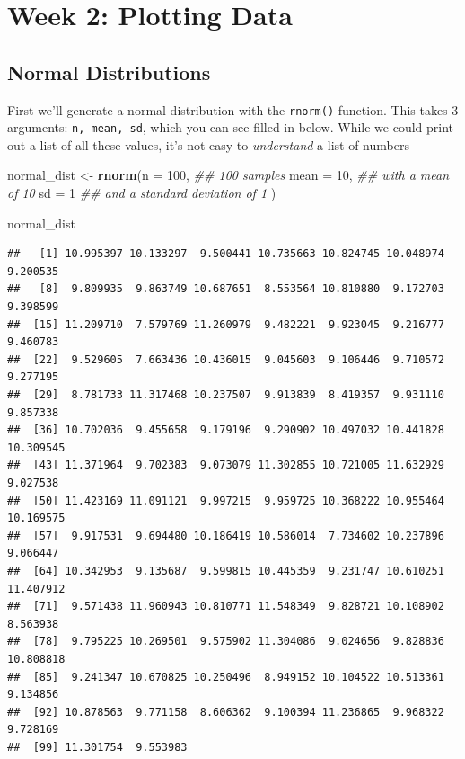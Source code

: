 \documentclass[
]{book}
\newenvironment{Shaded}{\begin{snugshade}}{\end{snugshade}}
\newcommand{\CommentTok}[1]{\textcolor[rgb]{0.56,0.35,0.01}{\textit{#1}}}
\newcommand{\DataTypeTok}[1]{\textcolor[rgb]{0.13,0.29,0.53}{#1}}
\newcommand{\DecValTok}[1]{\textcolor[rgb]{0.00,0.00,0.81}{#1}}
\newcommand{\KeywordTok}[1]{\textcolor[rgb]{0.13,0.29,0.53}{\textbf{#1}}}
\newcommand{\NormalTok}[1]{#1}
\newcommand{\StringTok}[1]{\textcolor[rgb]{0.31,0.60,0.02}{#1}}
\begin{document}
\hypertarget{week-2-plotting-data}{%
\section{Week 2: Plotting Data}\label{week-2-plotting-data}}

\hypertarget{normal-distributions}{%
\subsection{Normal Distributions}\label{normal-distributions}}

First we'll generate a normal distribution with the \texttt{rnorm()} function. This takes 3 arguments: \texttt{n,\ mean,\ sd}, which you can see filled in below. While we could print out a list of all these values, it's not easy to \emph{understand} a list of numbers

\begin{Shaded}
\begin{Highlighting}[]
\NormalTok{normal_dist <-}\StringTok{ }\KeywordTok{rnorm}\NormalTok{(}\DataTypeTok{n =} \DecValTok{100}\NormalTok{, }\CommentTok{## 100 samples}
                     \DataTypeTok{mean =} \DecValTok{10}\NormalTok{, }\CommentTok{## with a mean of 10}
                     \DataTypeTok{sd =} \DecValTok{1} \CommentTok{## and a standard deviation of 1}
\NormalTok{                     )}


\NormalTok{normal_dist}
\end{Highlighting}
\end{Shaded}

\begin{verbatim}
##   [1] 10.995397 10.133297  9.500441 10.735663 10.824745 10.048974  9.200535
##   [8]  9.809935  9.863749 10.687651  8.553564 10.810880  9.172703  9.398599
##  [15] 11.209710  7.579769 11.260979  9.482221  9.923045  9.216777  9.460783
##  [22]  9.529605  7.663436 10.436015  9.045603  9.106446  9.710572  9.277195
##  [29]  8.781733 11.317468 10.237507  9.913839  8.419357  9.931110  9.857338
##  [36] 10.702036  9.455658  9.179196  9.290902 10.497032 10.441828 10.309545
##  [43] 11.371964  9.702383  9.073079 11.302855 10.721005 11.632929  9.027538
##  [50] 11.423169 11.091121  9.997215  9.959725 10.368222 10.955464 10.169575
##  [57]  9.917531  9.694480 10.186419 10.586014  7.734602 10.237896  9.066447
##  [64] 10.342953  9.135687  9.599815 10.445359  9.231747 10.610251 11.407912
##  [71]  9.571438 11.960943 10.810771 11.548349  9.828721 10.108902  8.563938
##  [78]  9.795225 10.269501  9.575902 11.304086  9.024656  9.828836 10.808818
##  [85]  9.241347 10.670825 10.250496  8.949152 10.104522 10.513361  9.134856
##  [92] 10.878563  9.771158  8.606362  9.100394 11.236865  9.968322  9.728169
##  [99] 11.301754  9.553983
\end{verbatim}
\end{document}
